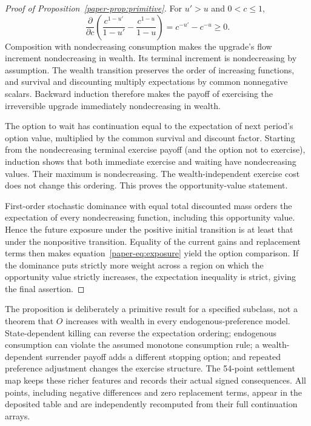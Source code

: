 \begin{proof}[Proof of Proposition~\ref{paper-prop:primitive}]
For $u'>u$ and $0<c\leq1$,
\[
 \frac{\partial}{\partial c}\left(\frac{c^{1-u'}}{1-u'}-\frac{c^{1-u}}{1-u}\right)
 =c^{-u'}-c^{-u}\geq0.
\]
Composition with nondecreasing consumption makes the upgrade's flow increment nondecreasing in wealth. Its terminal increment is nondecreasing by assumption. The wealth transition preserves the order of increasing functions, and survival and discounting multiply expectations by common nonnegative scalars. Backward induction therefore makes the payoff of exercising the irreversible upgrade immediately nondecreasing in wealth.

The option to wait has continuation equal to the expectation of next period's option value, multiplied by the common survival and discount factor. Starting from the nondecreasing terminal exercise payoff (and the option not to exercise), induction shows that both immediate exercise and waiting have nondecreasing values. Their maximum is nondecreasing. The wealth-independent exercise cost does not change this ordering. This proves the opportunity-value statement.

First-order stochastic dominance with equal total discounted mass orders the expectation of every nondecreasing function, including this opportunity value. Hence the future exposure under the positive initial transition is at least that under the nonpositive transition. Equality of the current gains and replacement terms then makes equation~\eqref{paper-eq:exposure} yield the option comparison. If the dominance puts strictly more weight across a region on which the opportunity value strictly increases, the expectation inequality is strict, giving the final assertion.
\end{proof}

The proposition is deliberately a primitive result for a specified subclass, not a theorem that $O$ increases with wealth in every endogenous-preference model. State-dependent killing can reverse the expectation ordering; endogenous consumption can violate the assumed monotone consumption rule; a wealth-dependent surrender payoff adds a different stopping option; and repeated preference adjustment changes the exercise structure. The 54-point settlement map keeps these richer features and records their actual signed consequences. All points, including negative differences and zero replacement terms, appear in the deposited table and are independently recomputed from their full continuation arrays.

